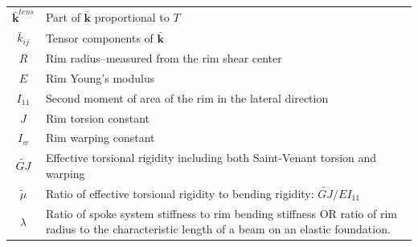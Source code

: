 \documentclass{bmd2016p}
\begin{document}
\begin{tabular}{c|p{12cm}}
$\bar{\bm{k}}^{tens}$ & Part of $\bar{\bm{k}}$ proportional to $T$\\
$\bar{k}_{ij}$ & Tensor components of $\bar{\bm{k}}$\\
$R$			& Rim radius--measured from the rim shear center\\
$E$			& Rim Young's modulus\\
$I_{11}$	& Second moment of area of the rim in the lateral direction\\
$J$			& Rim torsion constant\\
$I_w$		& Rim warping constant\\
$\widetilde{GJ}$ & Effective torsional rigidity including both Saint-Venant torsion and warping\\
$\tilde{\mu}$ & Ratio of effective torsional rigidity to bending rigidity: $\widetilde{GJ}/EI_{11}$\\
$\lambda$	& Ratio of spoke system stiffness to rim bending stiffness OR ratio of rim radius to 
			  the characteristic length of a beam on an elastic foundation.\\
\hline
\end{tabular}
\end{document}
